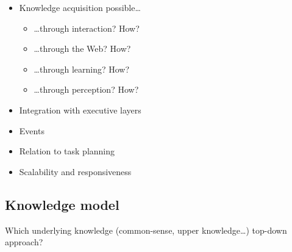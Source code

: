 \begin{itemize}
	\item Knowledge acquisition possible…
	\begin{itemize}
		\item …through interaction? How?
		\item …through the Web? How?
		\item …through learning? How?
		\item …through perception? How?
	\end{itemize}

	\item Integration with executive layers
	\item Events
	\item Relation to task planning
	\item Scalability and responsiveness
\end{itemize}

\subsection{Knowledge model}
\label{sect|eval-knowledge-model}

Which underlying knowledge (common-sense, upper knowledge…)
top-down approach?
